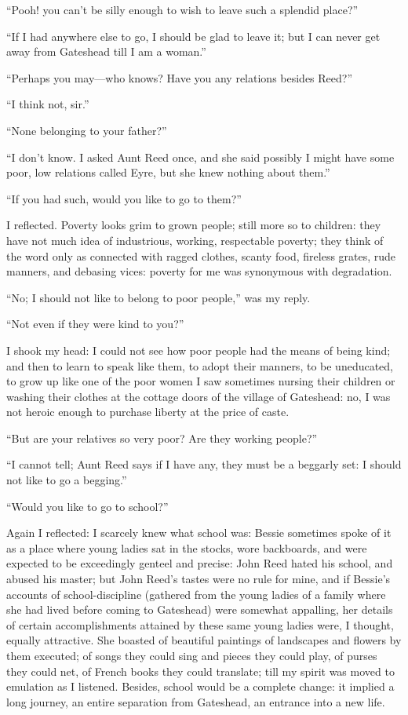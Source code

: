 \enquote{Pooh! you can't be silly enough to wish to leave such a
splendid place?}

\enquote{If I had anywhere else to go, I should be glad to leave it; but
I can never get away from Gateshead till I am a woman.}

\enquote{Perhaps you may---who knows?  Have you any relations besides
\Mrs{} Reed?}

\enquote{I think not, sir.}

\enquote{None belonging to your father?}

\enquote{I don't know.  I asked Aunt Reed once, and she said possibly I
might have some poor, low relations called Eyre, but she knew nothing
about them.}

\enquote{If you had such, would you like to go to them?}

I reflected.  Poverty looks grim to grown people; still more so to
children: they have not much idea of industrious, working, respectable
poverty; they think of the word only as connected with ragged clothes,
scanty food, fireless grates, rude manners, and debasing vices: poverty
for me was synonymous with degradation.

\enquote{No; I should not like to belong to poor people,} was my reply.

\enquote{Not even if they were kind to you?}

I shook my head: I could not see how poor people had the means of being
kind; and then to learn to speak like them, to adopt their manners, to
be uneducated, to grow up like one of the poor women I saw sometimes
nursing their children or washing their clothes at the cottage doors of
the village of Gateshead: no, I was not heroic enough to purchase
liberty at the price of caste.

\enquote{But are your relatives so very poor?  Are they working people?}

\enquote{I cannot tell; Aunt Reed says if I have any, they must be a
beggarly set: I should not like to go a begging.}

\enquote{Would you like to go to school?}

Again I reflected: I scarcely knew what school was: Bessie sometimes
spoke of it as a place where young ladies sat in the stocks, wore
backboards, and were expected to be exceedingly genteel and precise:
John Reed hated his school, and abused his master; but John Reed's
tastes were no rule for mine, and if Bessie's accounts of
school-discipline (gathered from the young ladies of a family where she
had lived before coming to Gateshead) were somewhat appalling, her
details of certain accomplishments attained by these same young ladies
were, I thought, equally attractive.  She boasted of beautiful paintings
of landscapes and flowers by them executed; of songs they could sing and
pieces they could play, of purses they could net, of French books they
could translate; till my spirit was moved to emulation as I listened. 
Besides, school would be a complete change: it implied a long journey,
an entire separation from Gateshead, an entrance into a new life.

